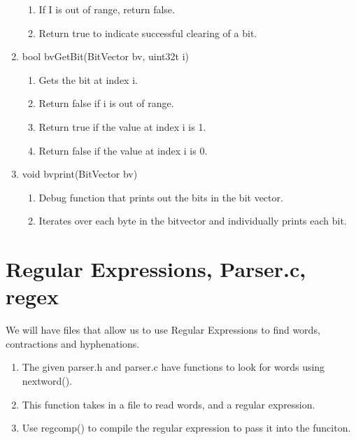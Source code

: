 \documentclass[11pt]{article}
\begin{document}
\begin{enumerate}
\begin{enumerate}
	\item If I is out of range, return false.
	\item Return true to indicate successful clearing of a bit.
	\end{enumerate}
\item bool bvGetBit(BitVector bv, uint32t i)
	\begin{enumerate}
	\item Gets the bit at index i.
	\item Return false if i is out of range.
	\item Return true if the value at index i is 1.
	\item Return false if the value at index i is 0.
	\end{enumerate}
\item void bvprint(BitVector bv)
	\begin{enumerate}
	\item Debug function that prints out the bits in the bit vector.
	\item Iterates over each byte in the bitvector and individually prints each bit.
	\end{enumerate}
\end{enumerate}

\section{Regular Expressions, Parser.c, regex}\label{ss:regex}
We will have files that allow us to use Regular Expressions to find words, contractions and hyphenations.

\begin{enumerate}
\item The given parser.h and parser.c have functions to look for words using nextword().
\item This function takes in a file to read words, and a regular expression.
\item Use regcomp() to compile the regular expression to pass it into the funciton.
\end{enumerate}
\end{document}
